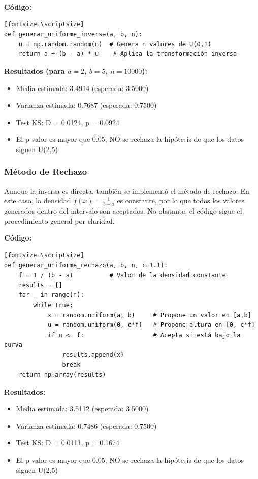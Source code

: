 \documentclass{article}
\begin{document}
\textbf{Código:}
\begin{verbatim}[fontsize=\scriptsize]
def generar_uniforme_inversa(a, b, n):
    u = np.random.random(n)  # Genera n valores de U(0,1)
    return a + (b - a) * u    # Aplica la transformación inversa
\end{verbatim}

\textbf{Resultados (para $a=2$, $b=5$, $n=10000$):}
\begin{itemize}
    \item Media estimada: 3.4914 (esperada: 3.5000)
    \item Varianza estimada: 0.7687 (esperada: 0.7500)
    \item Test KS: D = 0.0124, p = 0.0924
    \item El p-valor es mayor que 0.05, NO se rechaza la hipótesis de que los datos siguen U(2,5)
\end{itemize}

\vspace{0.5em}
\subsubsection{Método de Rechazo}
Aunque la inversa es directa, también se implementó el método de rechazo. En este caso, la densidad $f(x) = \frac{1}{b-a}$ es constante, por lo que todos los valores generados dentro del intervalo son aceptados. No obstante, el código sigue el procedimiento general por claridad.

\textbf{Código:}
\begin{verbatim}[fontsize=\scriptsize]
def generar_uniforme_rechazo(a, b, n, c=1.1):
    f = 1 / (b - a)          # Valor de la densidad constante
    results = []
    for _ in range(n):
        while True:
            x = random.uniform(a, b)     # Propone un valor en [a,b]
            u = random.uniform(0, c*f)   # Propone altura en [0, c*f]
            if u <= f:                   # Acepta si está bajo la curva
                results.append(x)
                break
    return np.array(results)
\end{verbatim}

\textbf{Resultados:}
\begin{itemize}
    \item Media estimada: 3.5112 (esperada: 3.5000)
    \item Varianza estimada: 0.7486 (esperada: 0.7500)
    \item Test KS: D = 0.0111, p = 0.1674
    \item El p-valor es mayor que 0.05, NO se rechaza la hipótesis de que los datos siguen U(2,5)
\end{itemize}
\end{document}
